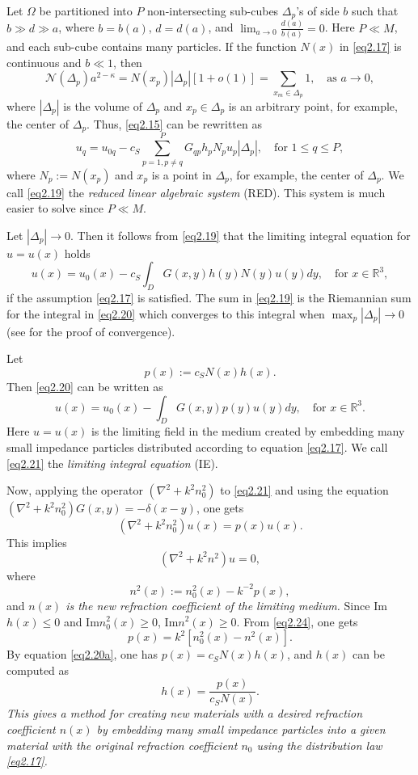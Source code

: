 \documentclass{wap}
\newcommand{\be}{\begin{equation}}
\newcommand{\ee}{\end{equation}}
\begin{document}
Let $\Omega$ be partitioned into $P$ non-intersecting sub-cubes $\Delta_p$'s of side $b$ such that $b \gg d \gg a$, where $b=b(a)$, $d=d(a)$, and $\lim_{a\to 0}\frac{d(a)}{b(a)}=0$. Here $P \ll M$,  and each sub-cube contains many particles.  If
the function $N(x)$  in \eqref{eq2.17} is continuous and $b \ll 1$, then
\be \label{eq2.18}
	\mathcal{N}(\Delta_p) a^{2-\kappa}=N(x_p)|\Delta_p|[1+o(1)]=\sum_{x_m \in \Delta_p}1, \quad\text{as } a \to 0,
\ee
where $|\Delta_p|$ is the volume of $\Delta_p$ and $x_p\in \Delta_p$ is an arbitrary point, for example, the center of $\Delta_p$.
Thus, \eqref{eq2.15} can be rewritten as
\be \label{eq2.19}
    u_q = u_{0q}-c_S\sum_{p=1, p \neq q}^P G_{qp} h_p N_p u_p |\Delta_p|, \quad\text{for } 1 \leq q \leq P,
\ee
where $N_p:=N(x_p)$ and $x_p$ is a point in $\Delta_p$, for example, the center of $\Delta_p$. We call \eqref{eq2.19} the \textit{reduced linear algebraic system} (RED). This system is much easier to solve since $P \ll M$.

Let $|\Delta_p| \to 0$. Then it follows from \eqref{eq2.19} that the limiting integral equation for $u=u(x)$ holds
\be \label{eq2.20}
    u(x)=u_0(x)-c_S\int_D G(x,y)h(y)N(y)u(y)dy, \quad\text{for } x \in \mathbb{R}^3,
\ee
 if the assumption \eqref{eq2.17} is satisfied. The sum in \eqref{eq2.19} is the Riemannian sum for the integral in \eqref{eq2.20} which converges to this integral when $\max_{p}|\Delta_p|\to 0$ (see \cite{R635} for the proof of convergence).

Let
\be \label{eq2.20a}
	p(x):=c_SN(x)h(x).
\ee
Then \eqref{eq2.20} can be written as
\be \label{eq2.21}
    u(x)=u_0(x)-\int_D G(x,y)p(y)u(y)dy, \quad\text{for } x \in \mathbb{R}^3.
\ee
 Here $u=u(x)$ is the limiting field in the medium created by embedding many small impedance particles distributed according to
  equation \eqref{eq2.17}. We call \eqref{eq2.21} the \textit{limiting integral equation} (IE).

Now, applying the operator $(\nabla^2+k^2n_0^2)$ to \eqref{eq2.21} and using the equation $(\nabla^2+k^2n_0^2)G(x,y)=-\delta(x-y)$, one gets
\be  \label{eq2.22}
    (\nabla^2+k^2n_0^2)u(x)=p(x)u(x).
\ee
This implies
\be \label{eq2.23}
	(\nabla^2+k^2n^2)u=0,
\ee
where
\be \label{eq2.24}
	n^2(x):=n_0^2(x)-k^{-2}p(x),
\ee
and {\em  $n(x)$ is the new refraction coefficient of the limiting medium.}
 Since Im$h(x) \le 0$ and Im$n_0^2(x) \ge 0$, Im$n^2(x) \ge 0$. From \eqref{eq2.24}, one gets
\be \label{eq2.25}
	p(x)=k^2[n_0^2(x)-n^2(x)].
\ee
By equation \eqref{eq2.20a},  one has $p(x)=c_SN(x)h(x)$, and $h(x)$ can be computed as
\be \label{eq2.26}
	h(x)=\frac{p(x)}{c_SN(x)}.
\ee
{\em This gives  a method for creating new materials with a desired refraction coefficient $n(x)$ by embedding many small impedance particles into a given material with the original refraction coefficient $n_0$ using the distribution law \eqref{eq2.17}.}\vspace{0.6em}
\end{document}
